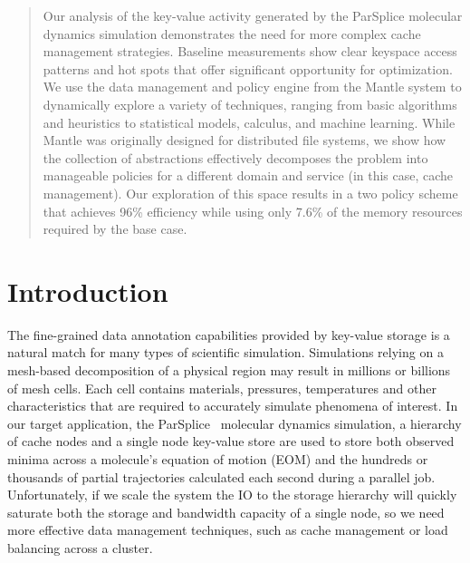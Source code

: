 \begin{abstract}

Our analysis of the key-value activity generated by the ParSplice molecular
dynamics simulation demonstrates the need for more complex cache management
strategies. Baseline measurements show clear keyspace access patterns and hot
spots that offer significant opportunity for optimization. We use the data
management and policy engine from the Mantle system to dynamically explore a
variety of techniques, ranging from basic algorithms and heuristics to
statistical models, calculus, and machine learning. While Mantle was originally
designed for distributed file systems, we show how the collection of
abstractions effectively decomposes the problem into manageable policies for a
different domain and service (in this case, cache management).  Our exploration
of this space results in a two policy scheme that achieves 96\% efficiency
while using only 7.6\% of the memory resources required by the base case. 

\end{abstract}

\section{Introduction}

The fine-grained data annotation capabilities provided by key-value storage is
a natural match for many types of scientific simulation. Simulations relying on
a mesh-based decomposition of a physical region may result in millions or
billions of mesh cells. Each cell contains materials, pressures, temperatures
and other characteristics that are required to accurately simulate phenomena of
interest. In our target application, the
ParSplice~\cite{perez:jctc20150parsplice} molecular dynamics simulation, a
hierarchy of cache nodes and a single node key-value store are used to store
both observed minima across a molecule's equation of motion (EOM) and the
hundreds or thousands of partial trajectories calculated each second during a
parallel job. Unfortunately, if we scale the system the IO to the storage
hierarchy will quickly saturate both the storage and bandwidth capacity of a
single node, so we need more effective data management techniques, such as
cache management or load balancing across a cluster.

